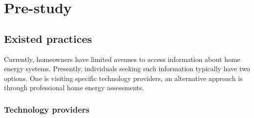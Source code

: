 \chapter{Pre-study} 






\section{Existed practices}

Currently, homeowners have limited avenues to access information about home energy systems. 
Presently, individuals seeking such information typically have two options. 
One is visiting specific technology providers, 
an alternative approach is through professional home energy assessments. 


\subsection{Technology providers}

